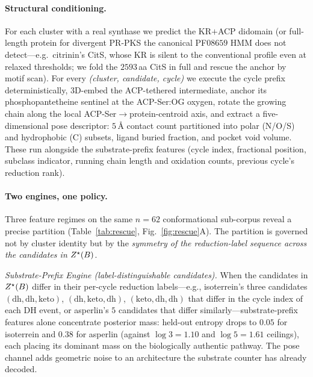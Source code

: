 \paragraph{Structural conditioning.} For each cluster with a real synthase we predict
the KR$+$ACP didomain (or full-length protein for divergent PR-PKS the canonical
PF$08659$ HMM does not detect---e.g.\ citrinin's CitS, whose KR is silent to the
conventional profile even at relaxed thresholds; we fold the $2593$\,aa CitS in full
and rescue the anchor by motif scan). For every \emph{(cluster, candidate, cycle)} we
execute the cycle prefix deterministically, $3$D-embed the ACP-tethered intermediate,
anchor its phosphopantetheine sentinel at the ACP-Ser:OG oxygen, rotate the growing
chain along the local ACP-Ser$\to$protein-centroid axis, and extract a five-dimensional
pose descriptor: $5$\,\AA{} contact count partitioned into polar (N/O/S) and
hydrophobic (C) subsets, ligand buried fraction, and pocket void volume. These run
alongside the substrate-prefix features (cycle index, fractional position, subclass
indicator, running chain length and oxidation counts, previous cycle's reduction rank).

\paragraph{Two engines, one policy.} Three feature regimes on the same $n=62$
conformational sub-corpus reveal a precise partition (Table~\ref{tab:rescue},
Fig.~\ref{fig:rescue}A). The partition is governed not by cluster identity but by the
\emph{symmetry of the reduction-label sequence across the candidates in $Z^{\star}(B)$}.

\emph{Substrate-Prefix Engine (label-distinguishable candidates).} When the candidates
in $Z^{\star}(B)$ differ in their per-cycle reduction labels---e.g., isoterrein's three
candidates $(\mathrm{dh},\mathrm{dh},\mathrm{keto})$, $(\mathrm{dh},\mathrm{keto},\mathrm{dh})$,
$(\mathrm{keto},\mathrm{dh},\mathrm{dh})$ that differ in the cycle index of each DH event,
or asperlin's $5$ candidates that differ similarly---substrate-prefix features alone
concentrate posterior mass: held-out entropy drops to $0.05$ for isoterrein and
$0.38$ for asperlin (against $\log 3=1.10$ and $\log 5=1.61$ ceilings), each placing its
dominant mass on the biologically authentic pathway. The pose
channel adds geometric noise to an architecture the substrate counter has already
decoded.

